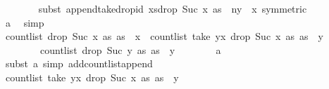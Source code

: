 \begin{isabellebody}
\ \ \ \ \ \ \isamarkupfalse%
\ {\isacharparenleft}{\kern0pt}subst\ append{\isacharunderscore}{\kern0pt}take{\isacharunderscore}{\kern0pt}drop{\isacharunderscore}{\kern0pt}id{\isacharbrackleft}{\kern0pt}\ xs{\isacharequal}{\kern0pt}{\isachardoublequoteopen}drop\ {\isacharparenleft}{\kern0pt}Suc\ x{\isacharparenright}{\kern0pt}\ as{\isachardoublequoteclose}\ \ n{\isacharequal}{\kern0pt}{\isachardoublequoteopen}y\ {\isacharminus}{\kern0pt}\ x{\isachardoublequoteclose}{\isacharcomma}{\kern0pt}\ symmetric{\isacharbrackright}{\kern0pt}{\isacharparenright}{\kern0pt}\isanewline
\ \ \ \ \ \ \isamarkupfalse%
\ a{}{\isacharunderscore}{\kern0pt}{}\ \isamarkupfalse%
\ simp\isanewline
\ \ \ \ \isamarkupfalse%
\ {\isachardoublequoteopen}count{\isacharunderscore}{\kern0pt}list\ {\isacharparenleft}{\kern0pt}drop\ {\isacharparenleft}{\kern0pt}Suc\ x{\isacharparenright}{\kern0pt}\ as{\isacharparenright}{\kern0pt}\ {\isacharparenleft}{\kern0pt}as\ {\isacharbang}{\kern0pt}\ x{\isacharparenright}{\kern0pt}\ {\isacharequal}{\kern0pt}\ count{\isacharunderscore}{\kern0pt}list\ {\isacharparenleft}{\kern0pt}take\ {\isacharparenleft}{\kern0pt}y{\isacharminus}{\kern0pt}x{\isacharparenright}{\kern0pt}\ {\isacharparenleft}{\kern0pt}drop\ {\isacharparenleft}{\kern0pt}Suc\ x{\isacharparenright}{\kern0pt}\ as{\isacharparenright}{\kern0pt}{\isacharparenright}{\kern0pt}\ {\isacharparenleft}{\kern0pt}as\ {\isacharbang}{\kern0pt}\ y{\isacharparenright}{\kern0pt}\ {\isacharplus}{\kern0pt}\isanewline
\ \ \ \ \ \ \ \ count{\isacharunderscore}{\kern0pt}list\ {\isacharparenleft}{\kern0pt}drop\ {\isacharparenleft}{\kern0pt}Suc\ y{\isacharparenright}{\kern0pt}\ as{\isacharparenright}{\kern0pt}\ {\isacharparenleft}{\kern0pt}as\ {\isacharbang}{\kern0pt}\ y{\isacharparenright}{\kern0pt}{\isachardoublequoteclose}\isanewline
\ \ \ \ \ \ \isamarkupfalse%
\ a{}{\isacharunderscore}{\kern0pt}{}\ \isamarkupfalse%
\ {\isacharparenleft}{\kern0pt}subst\ a{}{\isacharunderscore}{\kern0pt}{}{\isacharcomma}{\kern0pt}\ simp\ add{\isacharcolon}{\kern0pt}count{\isacharunderscore}{\kern0pt}list{\isacharunderscore}{\kern0pt}append{\isacharparenright}{\kern0pt}\isanewline
\ \ \ \ \isamarkupfalse%
\ \isamarkupfalse%
\ {\isachardoublequoteopen}count{\isacharunderscore}{\kern0pt}list\ {\isacharparenleft}{\kern0pt}take\ {\isacharparenleft}{\kern0pt}y{\isacharminus}{\kern0pt}x{\isacharparenright}{\kern0pt}\ {\isacharparenleft}{\kern0pt}drop\ {\isacharparenleft}{\kern0pt}Suc\ x{\isacharparenright}{\kern0pt}\ as{\isacharparenright}{\kern0pt}{\isacharparenright}{\kern0pt}\ {\isacharparenleft}{\kern0pt}as\ {\isacharbang}{\kern0pt}\ y{\isacharparenright}{\kern0pt}\ {\isasymge}\ {}{\isachardoublequoteclose}\isanewline

\end{isabellebody}
